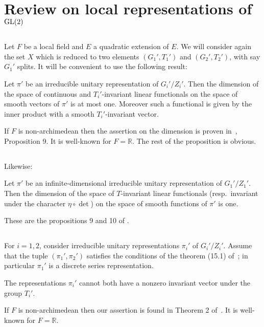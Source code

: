 \section{Review on local representations of $\mathrm{GL}(2)$}

\subsection{}
Let $F$ be a local field and $E$ a quadratic extension of $E$.
We will consider again the set $X$ which is reduced to two elements $(G_1', T_1')$ and $(G_2', T_2')$, with say $G_1'$ splits.
It will be convenient to use the following result:
\begin{proposition}
Let $\pi'$ be an irreducible unitary representation of $G_i' / Z_i'$.
Then the dimension of the space of continuous and $T_i'$-invariant linear functionals on the space of smooth vectors of $\pi'$ is at most one.
Moreover such a functional is given by the inner product with a smooth $T_i'$-invariant vector.
\end{proposition}
If $F$ is non-archimedean then the assertion on the dimension is proven in~\cite{waldspurger1991correspondances}, Proposition 9.
It is well-known for $F = \mathbb{R}$.
The rest of the proposition is obvious.

\subsection{}
Likewise:
\begin{proposition}
Let $\pi'$ be an infinite-dimensional irreducible unitary representation of $G_1' / Z_1'$.
Then the dimension of the space of $T$-invariant linear functionals (resp.\ invariant under the character $\eta \circ \det$) on the space of smooth functions of $\pi'$ is one.
\end{proposition}
These are the propositions 9 and 10 of \cite{waldspurger1980correspondances}.

\subsection{}
For $i = 1, 2$, consider irreducible unitary representations $\pi_i'$ of $G_i' / Z_i'$.
Assume that the tuple $(\pi_1', \pi_2')$ satisfies the conditions of the theorem (15.1) of~\cite{jacquet2006automorphic}; in particular $\pi_1'$ is a discrete series representation.

\begin{proposition}
The representations $\pi_i'$ cannot both have a nonzero invariant vector under the group $T_i'$.
\end{proposition}
If $F$ is non-archimedean then our assertion is found in Theorem 2 of~\cite{waldspurger1991correspondances}.
It is well-known for $F = \mathbb{R}$.
